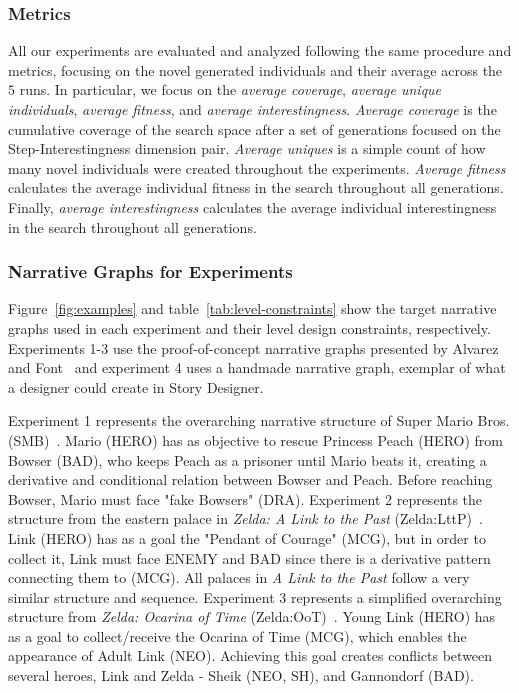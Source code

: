 
\subsubsection{Metrics}

All our experiments are evaluated and analyzed following the same procedure and metrics, focusing on the novel generated individuals and their average across the $5$ runs. In particular, we focus on the \textit{average coverage}, \textit{average unique individuals}, \textit{average fitness}, and \textit{average interestingness}. \textit{Average coverage} is the cumulative coverage of the search space after a set of generations focused on the Step-Interestingness dimension pair. \textit{Average uniques} is a simple count of how many novel individuals were created throughout the experiments. \textit{Average fitness} calculates the average individual fitness in the search throughout all generations. Finally, \textit{average interestingness} calculates the average individual interestingness in the search throughout all generations.



\subsubsection{Narrative Graphs for Experiments}

Figure~\ref{fig:examples} and table~\ref{tab:level-constraints} show the target narrative graphs used in each experiment and their level design constraints, respectively. Experiments 1-3 use the proof-of-concept narrative graphs presented by Alvarez and Font~\cite{p11alvarez_tropetwist_2022} and experiment 4 uses a handmade narrative graph, exemplar of what a designer could create in Story Designer. 

Experiment 1 represents the overarching narrative structure of Super Mario Bros. (SMB)~\cite{p11nintendo_rd1_super_1985}. Mario (HERO) has as objective to rescue Princess Peach (HERO) from Bowser (BAD), who keeps Peach as a prisoner until Mario beats it, creating a derivative and conditional relation between Bowser and Peach. Before reaching Bowser, Mario must face "fake Bowsers" (DRA). Experiment 2 represents the structure from the eastern palace in \emph{Zelda: A Link to the Past} (Zelda:LttP)~\cite{p11nintendo_rd4_legend_1991}. Link (HERO) has as a goal the "Pendant of Courage" (MCG), but in order to collect it, Link must face ENEMY and BAD since there is a derivative pattern connecting them to (MCG). All palaces in \textit{A Link to the Past} follow a very similar structure and sequence. Experiment 3 represents a simplified overarching structure from \emph{Zelda: Ocarina of Time} (Zelda:OoT)~\cite{p11nintendo_rd4_legend_1998}. Young Link (HERO) has as a goal to collect/receive the Ocarina of Time (MCG), which enables the appearance of Adult Link (NEO). Achieving this goal creates conflicts between several heroes, Link and Zelda - Sheik (NEO, SH), and Gannondorf (BAD). 

